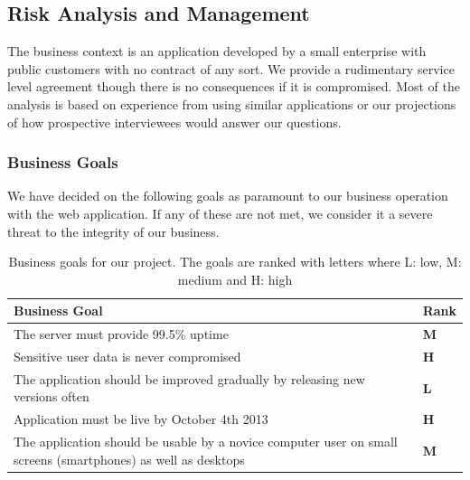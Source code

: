 \documentclass[a4paper]{article}
\begin{document}
\subsection{Risk Analysis and Management}
The business context is an application developed by a small enterprise with public customers with no contract of any sort. We provide a rudimentary service level agreement though there is no consequences if it is compromised. Most of the analysis is based on experience from using similar applications or our projections of how prospective interviewees would answer our questions.
\subsubsection{Business Goals}
We have decided on the following goals as paramount to our business operation with the web application. If any of these are not met, we consider it a severe threat to the integrity of our business.

\begin{table}[h!]
	\begin{tabular}{|p{10cm}|l|}
		\hline
		\textbf{Business Goal} & \textbf{Rank} \\ \hline
		The server must provide 99.5\% uptime   & \textbf{M} \\ \hline
		Sensitive user data is never compromised & \textbf{H} \\ \hline
		The application should be improved gradually by releasing new versions often & \textbf{L} \\ \hline
		Application must be live by October 4th 2013 &	\textbf{H}\\ \hline
		The application should be usable by a novice computer user on small screens (smartphones) as well as desktops & \textbf{M}\\ \hline
	\end{tabular}
	\caption{Business goals for our project. The goals are ranked with letters where L: low, M: medium and H: high}
	\label{tab:business_goals}
\end{table}
\end{document}
